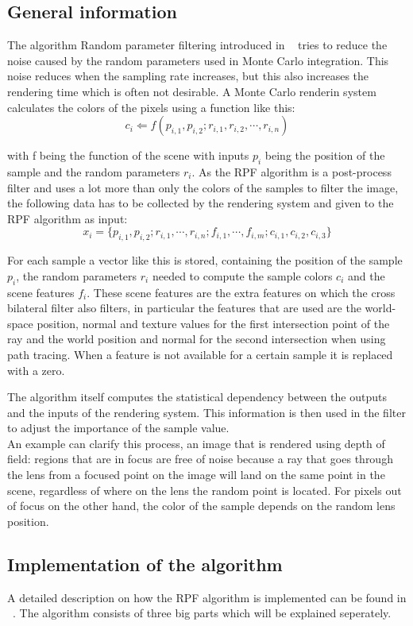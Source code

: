 \subsection{General information}
The algorithm Random parameter filtering introduced in ~\cite{RPF11} tries to reduce the noise caused by the random parameters used in Monte Carlo integration.
This noise reduces when the sampling rate increases, but this also increases the rendering time which is often not desirable.
A Monte Carlo renderin system calculates the colors of the pixels using a function like this:
\[
 c_i \Leftarrow f(p_{i,1},p_{i,2};r_{i,1},r_{i,2},\cdots,r_{i,n})
\]

with f being the function of the scene with inputs $p_i$ being the position of the sample and the random parameters $r_i$.
As the RPF algorithm is a post-process filter and uses a lot more than only the colors of the samples to filter the image, the following data has to be collected by the rendering system and given to the RPF algorithm as input:
\[
 x_i = \{p_{i,1},p_{i,2};r_{i,1},\cdots,r_{i,n};f_{i,1},\cdots,f_{i,m};c_{i,1},c_{i,2},c_{i,3}\}
\]

For each sample a vector like this is stored, containing the position of the sample $p_i$, the random parameters $r_i$ needed to compute the sample colors $c_i$ and the scene features $f_i$.
These scene features are the extra features on which the cross bilateral filter also filters, in particular the features that are used are
the world-space position, normal and texture values for the first intersection point of the ray and the world position and normal for the second intersection when using path tracing.
When a feature is not available for a certain sample it is replaced with a zero.

The algorithm itself computes the statistical dependency between the outputs and the inputs of the rendering system.
This information is then used in the filter to adjust the importance of the sample value.
\\
An example can clarify this process, an image that is rendered using depth of field:
regions that are in focus are free of noise because a ray that goes through the lens from a focused point on the image will land on the same point in the scene, regardless of where on the lens the random point is located.
For pixels out of focus on the other hand, the color of the sample depends on the random lens position.

\subsection{Implementation of the algorithm}
A detailed description on how the RPF algorithm is implemented can be found in ~\cite{RPFTechReport}.
The algorithm consists of three big parts which will be explained seperately.

